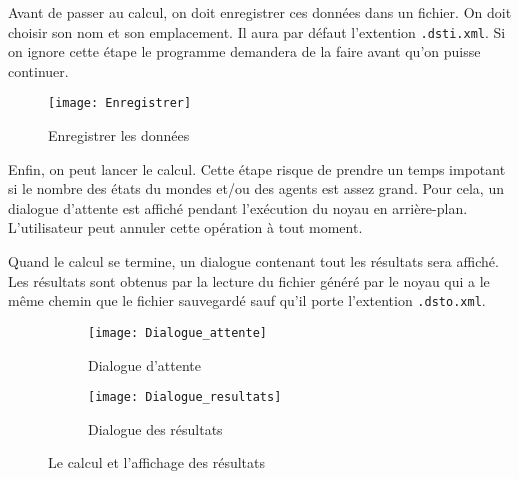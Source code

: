 Avant de passer au calcul, on doit enregistrer ces données dans un fichier. On doit choisir son nom
et son emplacement. Il aura par défaut l'extention \texttt{.dsti.xml}. Si on ignore cette étape le programme
demandera de la faire avant qu'on puisse continuer.

\begin{figure}[H]
\centering
\texttt{[image: Enregistrer]}
\caption{Enregistrer les données}
\end{figure}

Enfin, on peut lancer le calcul. Cette étape risque de prendre un temps impotant si le nombre des états
du mondes et/ou des agents est assez grand. Pour cela, un dialogue d'attente est affiché pendant l'exécution
du noyau en arrière-plan. L'utilisateur peut annuler cette opération à tout moment.

Quand le calcul se termine, un dialogue contenant tout les résultats sera affiché. Les résultats sont obtenus
par la lecture du fichier généré par le noyau qui a le même chemin que le fichier sauvegardé sauf qu'il porte
l'extention \texttt{.dsto.xml}.

\begin{figure}[H]
\begin{subfigure}{0.39\textwidth}
\texttt{[image: Dialogue\_attente]}
\caption{Dialogue d'attente}
\end{subfigure}
\hfill
\begin{subfigure}{0.59\textwidth}
\texttt{[image: Dialogue\_resultats]}
\caption{Dialogue des résultats}
\end{subfigure}
\caption{Le calcul et l'affichage des résultats}
\end{figure}
